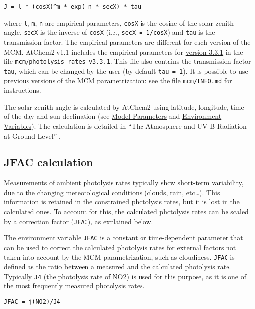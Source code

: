 \begin{verbatim}
J = l * (cosX)^m * exp(-n * secX) * tau
\end{verbatim}

where \texttt{l}, \texttt{m}, \texttt{n} are empirical parameters,
\texttt{cosX} is the cosine of the solar zenith angle, \texttt{secX}
is the inverse of \texttt{cosX} (i.e., \texttt{secX\ =\ 1/cosX}) and
\texttt{tau} is the transmission factor. The empirical parameters are
different for each version of the MCM. AtChem2 v1.1 includes the
empirical parameters for
\href{http://mcm.leeds.ac.uk/MCM/parameters/photolysis_param.htt}{version
  3.3.1} in the file \texttt{mcm/photolysis-rates\_v3.3.1}. This file
also contains the transmission factor \texttt{tau}, which can be
changed by the user (by default \texttt{tau\ =\ 1}). It is possible to
use previous versions of the MCM parametrization: see the file
\texttt{mcm/INFO.md} for instructions.

The solar zenith angle is calculated by AtChem2 using latitude,
longitude, time of the day and sun declination (see
\hyperref[sec:model-parameters]{Model Parameters} and
\hyperref[sec:environment-variables]{Environment Variables}). The
calculation is detailed in ``The Atmosphere and UV-B Radiation at
Ground Level'' \citep{Madronich_1993}.

\subsection{JFAC calculation} \label{subsec:jfac-calculation}

Measurements of ambient photolysis rates typically show short-term
variability, due to the changing meteorological conditions (clouds,
rain, etc\ldots{}). This information is retained in the constrained
photolysis rates, but it is lost in the calculated ones. To account
for this, the calculated photolysis rates can be scaled by a
correction factor (\texttt{JFAC}), as explained below.

The environment variable \texttt{JFAC} is a constant or time-dependent
parameter that can be used to correct the calculated photolysis rates
for external factors not taken into account by the MCM
parametrization, such as cloudiness. \texttt{JFAC} is defined as the
ratio between a measured and the calculated photolysis rate. Typically
\texttt{J4} (the photolysis rate of NO2) is used for this purpose, as
it is one of the most frequently measured photolysis rates.

\begin{verbatim}
JFAC = j(NO2)/J4
\end{verbatim}

